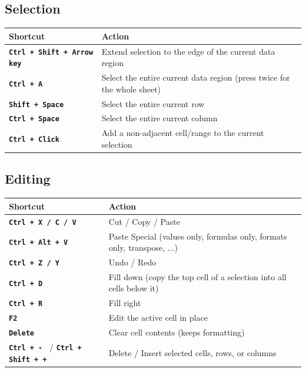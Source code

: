 \documentclass[11pt,a4paper]{article}
\newcommand{\key}[1]{\texttt{\colorbox{black!8}{\textbf{#1}}}}
\begin{document}
\subsection{Selection}

\begin{center}
\begin{tabular}{@{}p{5.4cm}p{6.6cm}@{}}
\toprule
\textbf{Shortcut} & \textbf{Action} \\
\midrule
\key{Ctrl + Shift + Arrow key} & Extend selection to the edge of the current data region \\
\key{Ctrl + A} & Select the entire current data region (press twice for the whole sheet) \\
\key{Shift + Space} & Select the entire current row \\
\key{Ctrl + Space} & Select the entire current column \\
\key{Ctrl + Click} & Add a non-adjacent cell/range to the current selection \\
\bottomrule
\end{tabular}
\end{center}

\subsection{Editing}

\begin{center}
\begin{tabular}{@{}p{5.4cm}p{6.6cm}@{}}
\toprule
\textbf{Shortcut} & \textbf{Action} \\
\midrule
\key{Ctrl + X / C / V} & Cut / Copy / Paste \\
\key{Ctrl + Alt + V} & Paste Special (values only, formulas only, formats only, transpose, ...) \\
\key{Ctrl + Z / Y} & Undo / Redo \\
\key{Ctrl + D} & Fill down (copy the top cell of a selection into all cells below it) \\
\key{Ctrl + R} & Fill right \\
\key{F2} & Edit the active cell in place \\
\key{Delete} & Clear cell contents (keeps formatting) \\
\key{Ctrl + -\,} / \key{Ctrl + Shift + +} & Delete / Insert selected cells, rows, or columns \\
\bottomrule
\end{tabular}
\end{center}
\end{document}
